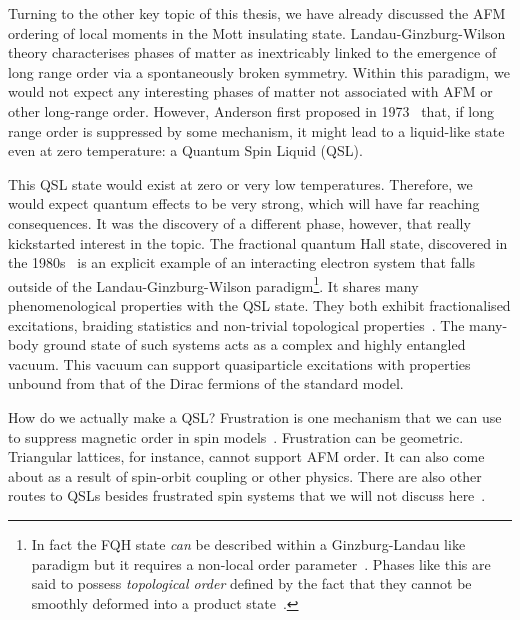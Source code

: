 Turning to the other key topic of this thesis, we have already discussed the AFM ordering of local moments in the Mott insulating state. Landau-Ginzburg-Wilson theory characterises phases of matter as inextricably linked to the emergence of long range order via a spontaneously broken symmetry. Within this paradigm, we would not expect any interesting phases of matter not associated with AFM or other long-range order. However, Anderson first proposed in 1973~\autocite{andersonResonatingValenceBonds1973} that, if long range order is suppressed by some mechanism, it might lead to a liquid-like state even at zero temperature: a Quantum Spin Liquid (QSL).

This QSL state would exist at zero or very low temperatures. Therefore, we would expect quantum effects to be very strong, which will have far reaching consequences. It was the discovery of a different phase, however, that really kickstarted interest in the topic. The fractional quantum Hall state, discovered in the 1980s~\autocite{laughlinAnomalousQuantumHall1983} is an explicit example of an interacting electron system that falls outside of the Landau-Ginzburg-Wilson paradigm\footnote{In fact the FQH state \emph{can} be described within a Ginzburg-Landau like paradigm but it requires a non-local order parameter~\autocite{girvinOffdiagonalLongrangeOrder1987,readOrderParameterGinzburgLandau1989}. Phases like this are said to possess \emph{topological order} defined by the fact that they cannot be smoothly deformed into a product state~\autocite{chenLocalUnitaryTransformation2010,wenQuantumOrdersSymmetric2002}.}. It shares many phenomenological properties with the QSL state. They both exhibit fractionalised excitations, braiding statistics and non-trivial topological properties~\autocite{broholmQuantumSpinLiquids2020}. The many-body ground state of such systems acts as a complex and highly entangled vacuum. This vacuum can support quasiparticle excitations with properties unbound from that of the Dirac fermions of the standard model.

How do we actually make a QSL? Frustration is one mechanism that we can use to suppress magnetic order in spin models~\autocite{TrebstPhysRep2022}. Frustration can be geometric. Triangular lattices, for instance, cannot support AFM order. It can also come about as a result of spin-orbit coupling or other physics. There are also other routes to QSLs besides frustrated spin systems that we will not discuss here~\autocite{balentsNodalLiquidTheory1998,balentsDualOrderParameter1999,linExactSymmetryWeaklyinteracting1998}.

